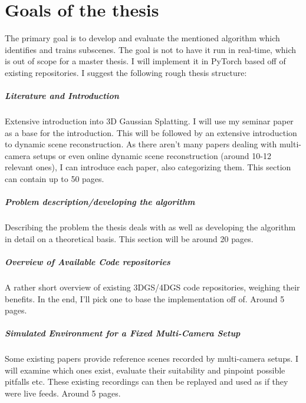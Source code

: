 \section{Goals of the thesis}

The primary goal is to develop and evaluate the mentioned algorithm which identifies and trains subscenes. The goal is not to have it run in real-time, which is out of scope for a master thesis. I will implement it in PyTorch based off of existing repositories. I suggest the following rough thesis structure:

\subparagraph{Literature and Introduction} Extensive introduction into 3D Gaussian Splatting. I will use my seminar paper as a base for the introduction. This will be followed by an extensive introduction to dynamic scene reconstruction. As there aren't many papers dealing with multi-camera setups or even online dynamic scene reconstruction (around 10-12 relevant ones), I can introduce each paper, also categorizing them. This section can contain up to 50 pages.

\subparagraph{Problem description/developing the algorithm} Describing the problem the thesis deals with as well as developing the algorithm in detail on a theoretical basis. This section will be around 20 pages.

\subparagraph{Overview of Available Code repositories} A rather short overview of existing 3DGS/\allowbreak 4DGS code repositories, weighing their benefits. In the end, I'll pick one to base the implementation off of. Around 5 pages.

\subparagraph{Simulated Environment for a Fixed Multi-Camera Setup} Some existing papers provide reference scenes recorded by multi-camera setups. I will examine which ones exist, evaluate their suitability and pinpoint possible pitfalls etc. These existing recordings can then be replayed and used as if they were live feeds. Around 5 pages.

